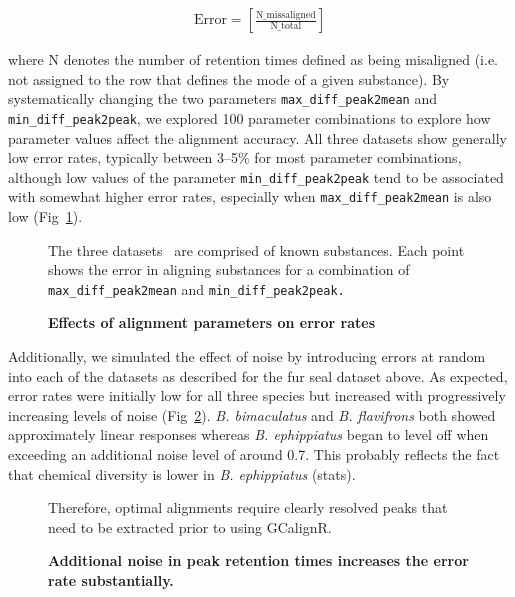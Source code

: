 \documentclass[10pt,letterpaper]{article}
\begin{document}
\begin{eqnarray}
\label{Eq:three}
\mathrm{Error} = \left[\frac{\mathrm{N\_missaligned}}{\mathrm{N\_total}}\right] 
\end{eqnarray}

where N denotes the number of retention times defined as being misaligned (i.e. not assigned to the row that defines the mode of a given substance). By systematically changing the two parameters \texttt{max\_diff\_peak2mean} and \texttt{min\_diff\_peak2peak}, we explored 100 parameter combinations to explore how parameter values affect the alignment accuracy. All three datasets show generally low error rates, typically between 3–5\% for most parameter combinations, although low values of the parameter \texttt{min\_diff\_peak2peak} tend to be associated with somewhat higher error rates, especially when \texttt{max\_diff\_peak2mean} is also low (Fig~\ref{Fig:Fig7}).

\begin{figure}[htbp]
\centering
\caption{\textbf{Effects of alignment parameters on error rates}}
The three datasets~\cite{Dellicour.2013} are comprised of known substances. Each point shows the error in aligning substances for a combination of \texttt{max\_diff\_peak2mean} and \texttt{min\_diff\_peak2peak.}
\label{Fig:Fig7}
\end{figure} 

Additionally, we simulated the effect of noise by introducing errors at random into each of the datasets as described for the fur seal dataset above. As expected, error rates were initially low for all three species but increased with progressively increasing levels of noise (Fig~\ref{Fig:Fig8}).  \textit{B. bimaculatus} and \textit{B. flavifrons} both showed approximately linear responses whereas \textit{B. ephippiatus} began to level off when exceeding an additional noise level of around 0.7.  This probably reflects the fact that chemical diversity is lower in \textit{B. ephippiatus} (stats).

\begin{figure}[htbp]
\centering
\caption{\textbf{Additional noise in peak retention times increases the error rate substantially.}}
Therefore, optimal alignments require clearly resolved peaks that need to be extracted prior to using GCalignR.
\label{Fig:Fig8}
\end{figure} 
\end{document}
